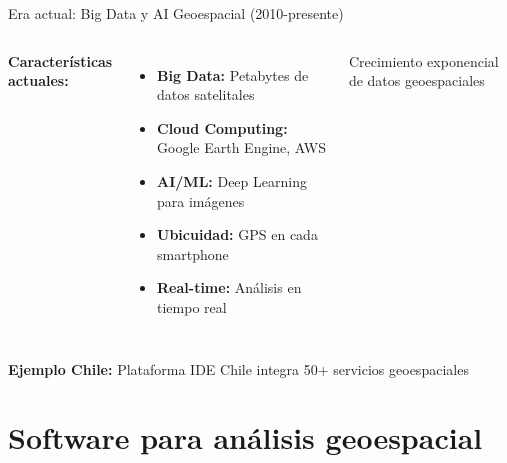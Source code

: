 \documentclass[10pt]{beamer}
\begin{document}
\begin{frame}{Era actual: Big Data y AI Geoespacial (2010-presente)}
    \begin{columns}
        \textbf{Características actuales:}
        \begin{itemize}
            \item \textcolor{blue}{} \textbf{Big Data:} Petabytes de datos satelitales
            \item \textcolor{green}{} \textbf{Cloud Computing:} Google Earth Engine, AWS
            \item \textcolor{red}{} \textbf{AI/ML:} Deep Learning para imágenes
            \item \textcolor{orange}{} \textbf{Ubicuidad:} GPS en cada smartphone
            \item \textcolor{purple}{} \textbf{Real-time:} Análisis en tiempo real
        \end{itemize}
        
        \small{Crecimiento exponencial de datos geoespaciales}
    \end{columns}
    
    \vspace{0.3cm}
    \textbf{Ejemplo Chile:} Plataforma IDE Chile integra 50+ servicios geoespaciales
\end{frame}

\section{Software para análisis geoespacial}
\end{document}
